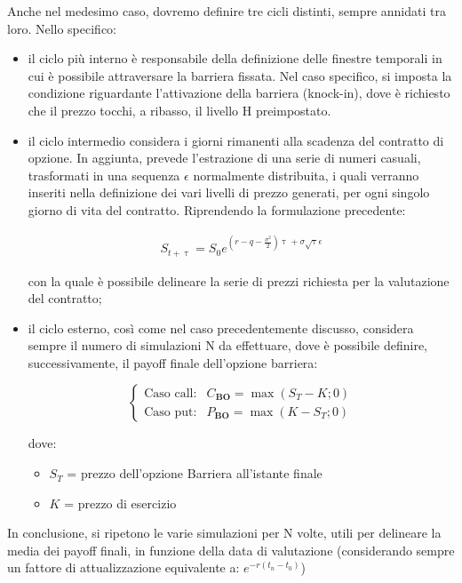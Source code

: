 \documentclass[12pt,a4paper]{report}
\begin{document}
Anche nel medesimo caso, dovremo definire tre cicli distinti, sempre annidati tra loro. Nello specifico: 
\begin{itemize}
 \item il ciclo più interno è responsabile della definizione delle finestre temporali in cui è possibile attraversare la barriera fissata. Nel caso specifico, si imposta la condizione riguardante l'attivazione della barriera (knock-in), dove è richiesto che il prezzo tocchi, a ribasso, il livello H preimpostato.


\item il ciclo intermedio considera i giorni rimanenti alla scadenza del contratto di opzione. In aggiunta, prevede l'estrazione di una serie di numeri casuali, trasformati in una sequenza $\epsilon$ normalmente distribuita, i quali verranno inseriti nella definizione dei vari livelli di prezzo generati, per ogni singolo giorno di vita del contratto. Riprendendo la formulazione precedente:

\begin{align*}
    S_{t+\uptau} = S_0 e^{(r-q-\frac{\sigma^2}{2})\uptau+\sigma\sqrt{\uptau}\epsilon}
\end{align*}

con la quale è possibile delineare la serie di prezzi richiesta per la valutazione del contratto;

\item il ciclo esterno, così come nel caso precedentemente discusso, considera sempre il numero di simulazioni N da effettuare, dove è possibile definire, successivamente, il payoff finale dell'opzione barriera:

\begin{equation}
\begin{cases}
\text{Caso call:} & C_{\textbf{BO}} = \max(S_T - K; 0) \\
\text{Caso put:} & P_{\textbf{BO}} = \max(K - S_T; 0)
\end{cases}
\end{equation}

dove:

\begin{itemize}
    \item $S_T$ = prezzo dell'opzione Barriera all'istante finale
    \item $K$ = prezzo di esercizio
\end{itemize}
\end{itemize}

In conclusione, si ripetono le varie simulazioni per N volte, utili per delineare la media dei payoff finali, in funzione della data di valutazione (considerando sempre un fattore di attualizzazione equivalente a: $e^{-r(t_n - t_0)}$)
\end{document}
